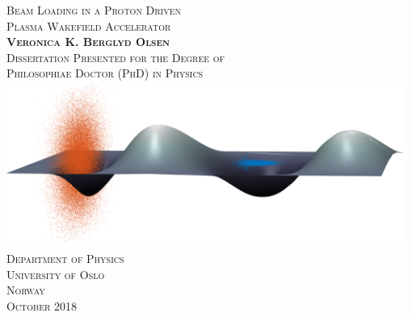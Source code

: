 \begin{titlepage}
    \begin{center}
        \vspace*{10mm}
        \huge
        \scshape
        Beam Loading in a Proton Driven\\
        Plasma Wakefield Accelerator\\
        \vspace{20mm}
        \large
        \upshape
        \textbf{Veronica K. Berglyd Olsen}\\
        \vspace{4mm}
        Dissertation Presented for the Degree of\\
        Philosophiae Doctor (PhD) in Physics\\
        \vspace{26mm}
        \includegraphics[width=0.98\textwidth]{images/3DWakefield.png}\\
        \vspace{18mm}
        Department of Physics\\
        University of Oslo\\
        Norway\\
        \large{October 2018}
    \end{center}
\end{titlepage}
